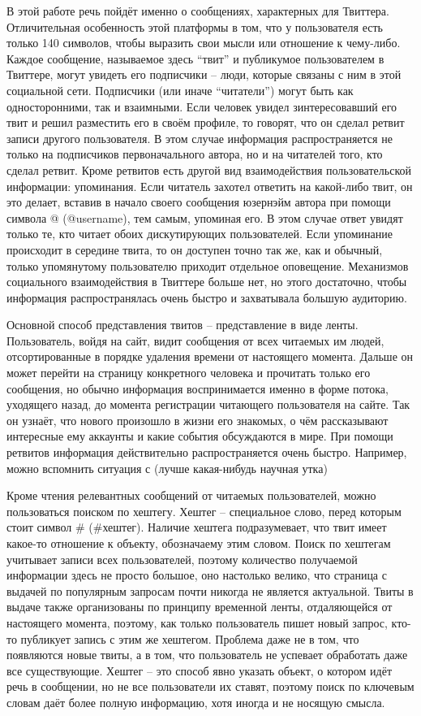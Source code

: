 В этой работе речь пойдёт именно о сообщениях, характерных для Твиттера.
Отличительная особенность этой платформы в том, что у пользователя есть
только 140 символов, чтобы выразить свои мысли или отношение к чему-либо.
Каждое сообщение, называемое здесь ``твит'' и публикумое пользователем в
Твиттере, могут увидеть его подписчики -- люди, которые связаны с ним в этой
социальной сети. Подписчики (или иначе ``читатели'') могут быть как
односторонними, так и взаимными. Если человек увидел зинтересовавший его твит
и решил разместить его в своём профиле, то говорят, что он сделал ретвит
записи другого пользователя. В этом случае информация распространяется не только
на подписчиков первоначального автора, но и на читателей того, кто сделал
ретвит. Кроме ретвитов есть другой вид взаимодействия пользовательской
информации: упоминания. Если читатель захотел ответить на какой-либо твит,
он это делает, вставив в начало своего сообщения юзернэйм автора при помощи
символа @ (@username), тем самым, упоминая его. В этом случае ответ увидят
только те, кто читает обоих дискутирующих пользователей. Если упоминание
происходит в середине твита, то он доступен точно так же, как и обычный,
только упомянутому пользователю приходит отдельное оповещение.
Механизмов социального взаимодействия в Твиттере больше нет, но этого достаточно,
чтобы информация распространялась очень быстро и захватывала большую аудиторию.

Основной способ представления твитов -- представление в виде ленты.
Пользователь, войдя на сайт, видит сообщения от всех читаемых им людей,
отсортированные в порядке удаления времени от настоящего момента. Дальше
он может перейти на страницу конкретного человека и прочитать только его
сообщения,  но обычно информация воспринимается именно в форме потока,
уходящего назад, до момента регистрации читающего пользователя на сайте.
Так он узнаёт, что нового произошло в жизни его знакомых, о чём рассказывают
интересные ему аккаунты и какие события обсуждаются в мире. При помощи ретвитов
информация действительно распространяется очень быстро. Например, можно
вспомнить ситуация с (лучше какая-нибудь научная утка)

Кроме чтения релевантных сообщений от читаемых пользователей, можно
пользоваться поиском по хештегу. Хештег -- специальное слово, перед которым
стоит символ # (#хештег). Наличие хештега подразумевает, что твит имеет какое-то
отношение к объекту, обозначаему этим словом. Поиск по хештегам учитывает
записи всех пользователей, поэтому количество получаемой информации здесь не
просто большое, оно настолько велико, что страница с выдачей по популярным
запросам почти никогда не является актуальной. Твиты в выдаче также организованы
по принципу временной ленты, отдаляющейся от настоящего момента, поэтому, как
только пользователь пишет новый запрос, кто-то публикует запись с этим же хештегом.
Проблема даже не в том, что появляются новые твиты, а в том, что пользователь не
успевает обработать даже все существующие. Хештег -- это способ явно указать объект, о
котором идёт речь в сообщении, но не все пользователи их ставят, поэтому поиск
по ключевым словам даёт более полную информацию, хотя иногда и не носящую смысла.
